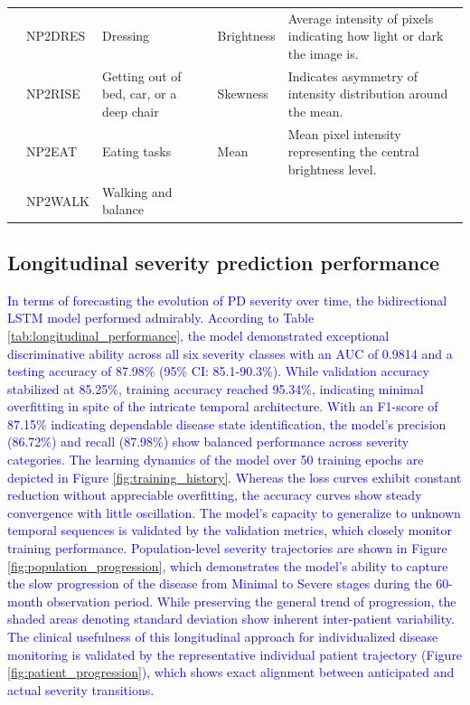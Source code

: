 \documentclass[twocolumn]{article}
\begin{document}
\begin{table}[h]
\begin{tabular}{ll p{4.5cm}l p{5.7cm}}
        & NP2DRES  & Dressing                                 
        & Brightness        & Average intensity of pixels indicating how light or dark the image is. \\
        
        & NP2RISE  & Getting out of bed, car, or a deep chair   
        & Skewness          & Indicates asymmetry of intensity distribution around the mean. \\
        
        & NP2EAT   & Eating tasks                             
        & Mean              & Mean pixel intensity representing the central brightness level. \\
        
        & NP2WALK  & Walking and balance                      
        &                   & \\
    \hline
    \end{tabular}
\end{table}


\subsection{Longitudinal severity prediction performance}
\label{sec:longitudinal_results}

\textcolor{blue}{In terms of forecasting the evolution of PD severity over time, the bidirectional LSTM model performed admirably.  According to Table \ref{tab:longitudinal_performance}, the model demonstrated exceptional discriminative ability across all six severity classes with an AUC of 0.9814 and a testing accuracy of 87.98\% (95\% CI: 85.1-90.3\%).  While validation accuracy stabilized at 85.25\%, training accuracy reached 95.34\%, indicating minimal overfitting in spite of the intricate temporal architecture.  With an F1-score of 87.15\% indicating dependable disease state identification, the model's precision (86.72\%) and recall (87.98\%) show balanced performance across severity categories.
The learning dynamics of the model over 50 training epochs are depicted in Figure \ref{fig:training_history}.  Whereas the loss curves exhibit constant reduction without appreciable overfitting, the accuracy curves show steady convergence with little oscillation.  The model's capacity to generalize to unknown temporal sequences is validated by the validation metrics, which closely monitor training performance.  Population-level severity trajectories are shown in Figure \ref{fig:population_progression}, which demonstrates the model's ability to capture the slow progression of the disease from Minimal to Severe stages during the 60-month observation period.  While preserving the general trend of progression, the shaded areas denoting standard deviation show inherent inter-patient variability.  The clinical usefulness of this longitudinal approach for individualized disease monitoring is validated by the representative individual patient trajectory (Figure \ref{fig:patient_progression}), which shows exact alignment between anticipated and actual severity transitions.}
\end{document}
